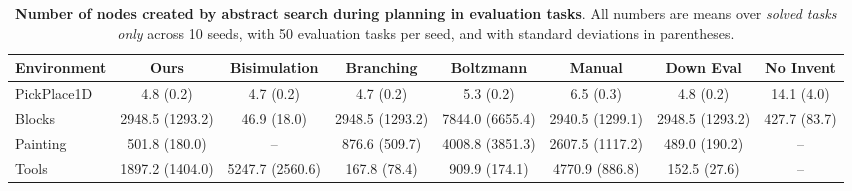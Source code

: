 \begin{table}[t]
	\centering
	\scriptsize
	
	\begin{tabular}{| l | c || c | c | c || c | c | c | }
	\hline
	{\bf{Environment}} &{\bf{Ours}} &
	{\bf{Bisimulation}} &
	{\bf{Branching}} &
	{\bf{Boltzmann}} &
	{\bf{Manual}} &
	{\bf{Down Eval}} &
	{\bf{No Invent}} \\
	\hline
	PickPlace1D & 4.8 (0.2) & 4.7 (0.2) & 4.7 (0.2) & 5.3 (0.2) &    6.5 (0.3) & 4.8 (0.2) & 14.1 (4.0) \\
	Blocks & 2948.5 (1293.2) & 46.9 (18.0) & 2948.5 (1293.2) & 7844.0 (6655.4) &    2940.5 (1299.1) & 2948.5 (1293.2) & 427.7 (83.7) \\
	Painting & 501.8 (180.0) & \;\;\;-- & 876.6 (509.7) & 4008.8 (3851.3) &    2607.5 (1117.2) & 489.0 (190.2) & \;\;\;-- \\
	Tools & 1897.2 (1404.0) & 5247.7 (2560.6) & 167.8 (78.4) & 909.9 (174.1) &    4770.9 (886.8) & 152.5 (27.6) & \;\;\;-- \\\hline
	\end{tabular}
	\caption{\textbf{Number of nodes created by abstract search during planning in evaluation tasks}. All numbers are means over \emph{solved tasks only} across 10 seeds, with 50 evaluation tasks per seed, and with standard deviations in parentheses.}
	\label{tab:allnodesresults}
\end{table}